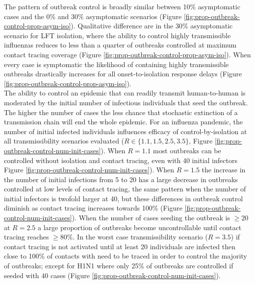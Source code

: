 \documentclass{article}
\begin{document}
The pattern of outbreak control is broadly similar between 10\% asymptomatic cases and the 0\% and 30\% asymptomatic scenarios (Figure \ref{fig:prop-outbreak-control-prop-asym-iso}). Qualitative difference are in the 30\% asymptomatic scenario for LFT isolation, where the ability to control highly transmissible influenzas reduces to less than a quarter of outbreaks controlled at maximum contact tracing coverage (Figure \ref{fig:prop-outbreak-control-prop-asym-iso}). When every case is symptomatic the likelihood of containing highly transmissible outbreaks drastically increases for all onset-to-isolation response delays (Figure \ref{fig:prop-outbreak-control-prop-asym-iso}). \\

The ability to control an epidemic that can readily transmit human-to-human is moderated by the initial number of infectious individuals that seed the outbreak. The higher the number of cases the less chance that stochastic extinction of a transmission chain will end the whole epidemic. For an influenza pandemic, the number of initial infected individuals influences efficacy of control-by-isolation at all transmissibility scenarios evaluated ($R \in \{1.1, 1.5, 2.5, 3.5\}$, Figure \ref{fig:prop-outbreak-control-num-init-cases}). When $R = 1.1$ most outbreaks can be controlled without isolation and contact tracing, even with 40 initial infectors Figure \ref{fig:prop-outbreak-control-num-init-cases}). When $R = 1.5$ the increase in the number of initial infections from 5 to 20 has a large decrease in outbreaks controlled at low levels of contact tracing, the same pattern when the number of initial infectors is twofold larger at 40, but these differences in outbreak control diminish as contact tracing increases towards 100\% (Figure \ref{fig:prop-outbreak-control-num-init-cases}). When the number of cases seeding the outbreak is $\geq 20$ at $R = 2.5$ a large proportion of outbreaks become uncontrollable until contact tracing reaches $\geq 80\%$. In the worst case transmissibility scenario ($R = 3.5$) if contact tracing is not activated until at least 20 individuals are infected then close to 100\% of contacts with need to be traced in order to control the majority of outbreaks; except for H1N1 where only 25\% of outbreaks are controlled if seeded with 40 cases (Figure \ref{fig:prop-outbreak-control-num-init-cases}).  \\
\end{document}
